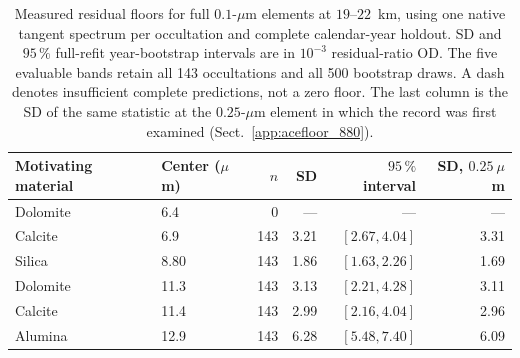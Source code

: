 \begin{table}[t]
\caption{Measured residual floors for full $0.1$-$\mu$m elements at $19$--$22$~km, using one native tangent spectrum per occultation and complete calendar-year holdout. SD and $95\,\%$ full-refit year-bootstrap intervals are in $10^{-3}$ residual-ratio OD. The five evaluable bands retain all 143 occultations and all 500 bootstrap draws. A dash denotes insufficient complete predictions, not a zero floor. The last column is the SD of the same statistic at the $0.25$-$\mu$m element in which the record was first examined (Sect.~\ref{app:acefloor_880}).}
\label{tab:ace_floors}
\centering
\begin{tabular}{llrrrr}
\toprule
Motivating material & Center ($\mu$m) & $n$ & SD & $95\,\%$ interval & SD, $0.25~\mu$m \\
\midrule
Dolomite & 6.4 & 0 & --- & --- & --- \\
Calcite & 6.9 & 143 & 3.21 & $[2.67, 4.04]$ & 3.31 \\
Silica & 8.80 & 143 & 1.86 & $[1.63, 2.26]$ & 1.69 \\
Dolomite & 11.3 & 143 & 3.13 & $[2.21, 4.28]$ & 3.11 \\
Calcite & 11.4 & 143 & 2.99 & $[2.16, 4.04]$ & 2.96 \\
Alumina & 12.9 & 143 & 6.28 & $[5.48, 7.40]$ & 6.09 \\
\bottomrule
\end{tabular}
\end{table}
